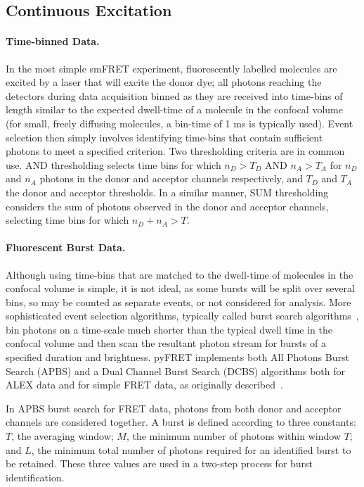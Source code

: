 \subsection{Continuous Excitation}
\paragraph{Time-binned Data.}
\label{par:time-binned_data}
In the most simple smFRET experiment, fluorescently labelled molecules are excited by a laser that will excite the donor dye; all photons reaching the detectors during data acquisition binned as they are received into time-bins of length similar to the expected dwell-time of a molecule in the confocal volume (for small, freely diffusing molecules, a bin-time of 1 ms is typically used). Event selection then simply involves identifying time-bins that contain sufficient photons to meet a specified criterion. Two thresholding criteria are in common use. AND thresholding selects time bins for which $n_D > T_D$ AND $n_A > T_A$ for $n_D$ and $n_A$ photons in the donor and acceptor channels respectively, and $T_D$ and $T_A$ the donor and acceptor thresholds. In a similar manner, SUM thresholding considers the sum of photons observed in the donor and acceptor channels, selecting time bins for which $n_D + n_A > T$.

\paragraph{Fluorescent Burst Data.}
\label{par:burst_data}
Although using time-bins that are matched to the dwell-time of molecules in the confocal volume is simple, it is not ideal, as some bursts will be split over several bins, so may be counted as separate events, or not considered for analysis. More sophisticated event selection algorithms, typically called burst search algorithms~\cite{nir06}, bin photons on a time-scale much shorter than the typical dwell time in the confocal volume and then scan the resultant photon stream for bursts of a specified duration and brightness. pyFRET implements both All Photons Burst Search (APBS) and a Dual Channel Burst Search (DCBS) algorithms both for ALEX data and for simple FRET data, as originally described~\cite{nir06}.

In APBS burst search for FRET data, photons from both donor and acceptor channels are considered together. A burst is defined according to three constants: $T$, the averaging window; $M$, the minimum number of photons within window $T$; and $L$, the minimum total number of photons required for an identified burst to be retained. These three values are used in a two-step process for burst identification.

